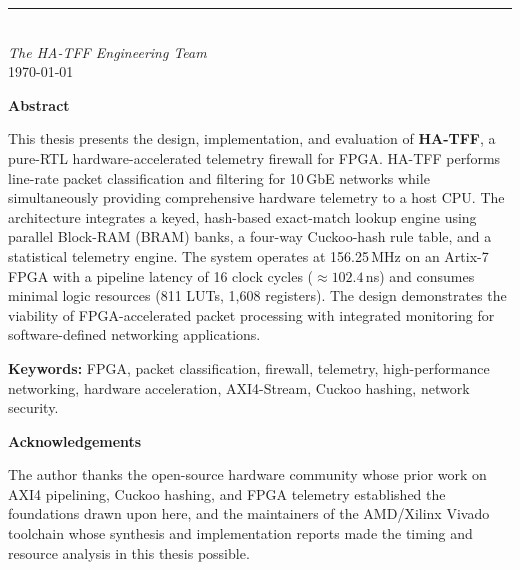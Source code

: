 \documentclass[12pt,twoside,openright]{book}
\begin{document}
\vspace{10mm}
\begin{flushright}
\rule{60mm}{0.4pt}\\
\textit{The HA-TFF Engineering Team}\\
\today
\end{flushright}

\cleardoublepage
\thispagestyle{empty}
\vspace*{45mm}
\begin{center}
{\Large\bfseries Abstract}
\end{center}
\vspace{6mm}

\noindent This thesis presents the design, implementation, and evaluation of \textbf{HA-TFF}, a
pure-RTL hardware-accelerated telemetry firewall for FPGA. HA-TFF performs line-rate packet
classification and filtering for 10\,GbE networks while simultaneously providing comprehensive
hardware telemetry to a host CPU. The architecture integrates a keyed, hash-based exact-match
lookup engine using parallel Block-RAM (BRAM) banks, a four-way Cuckoo-hash rule table, and a
statistical telemetry engine. The system operates at 156.25\,MHz on an Artix-7 FPGA with a pipeline
latency of 16 clock cycles ($\approx 102.4$\,ns) and consumes minimal logic resources (811 LUTs,
1{,}608 registers). The design demonstrates the viability of FPGA-accelerated packet processing
with integrated monitoring for software-defined networking applications.

\vspace{4mm}
\noindent\textbf{Keywords:} FPGA, packet classification, firewall, telemetry, high-performance
networking, hardware acceleration, AXI4-Stream, Cuckoo hashing, network security.

\cleardoublepage
\thispagestyle{empty}
\vspace*{45mm}
\begin{center}
{\Large\bfseries Acknowledgements}
\end{center}
\vspace{6mm}
\noindent The author thanks the open-source hardware community whose prior work on AXI4 pipelining,
Cuckoo hashing, and FPGA telemetry established the foundations drawn upon here, and the maintainers
of the AMD/Xilinx Vivado toolchain whose synthesis and implementation reports made the timing and
resource analysis in this thesis possible.

\cleardoublepage
\thispagestyle{empty}
\tableofcontents
\cleardoublepage
\thispagestyle{empty}
\listoffigures
\cleardoublepage
\thispagestyle{empty}
\listoftables
\cleardoublepage
\thispagestyle{empty}
\end{document}
